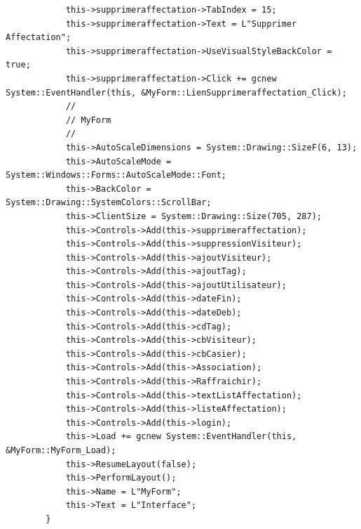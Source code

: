 \documentclass[main.tex]{subfiles}
\begin{document}
\begin{lstlisting}
			this->supprimeraffectation->TabIndex = 15;
			this->supprimeraffectation->Text = L"Supprimer Affectation";
			this->supprimeraffectation->UseVisualStyleBackColor = true;
			this->supprimeraffectation->Click += gcnew System::EventHandler(this, &MyForm::LienSupprimeraffectation_Click);
			// 
			// MyForm
			// 
			this->AutoScaleDimensions = System::Drawing::SizeF(6, 13);
			this->AutoScaleMode = System::Windows::Forms::AutoScaleMode::Font;
			this->BackColor = System::Drawing::SystemColors::ScrollBar;
			this->ClientSize = System::Drawing::Size(705, 287);
			this->Controls->Add(this->supprimeraffectation);
			this->Controls->Add(this->suppressionVisiteur);
			this->Controls->Add(this->ajoutVisiteur);
			this->Controls->Add(this->ajoutTag);
			this->Controls->Add(this->ajoutUtilisateur);
			this->Controls->Add(this->dateFin);
			this->Controls->Add(this->dateDeb);
			this->Controls->Add(this->cdTag);
			this->Controls->Add(this->cbVisiteur);
			this->Controls->Add(this->cbCasier);
			this->Controls->Add(this->Association);
			this->Controls->Add(this->Raffraichir);
			this->Controls->Add(this->textListAffectation);
			this->Controls->Add(this->listeAffectation);
			this->Controls->Add(this->login);
			this->Load += gcnew System::EventHandler(this, &MyForm::MyForm_Load);
			this->ResumeLayout(false);
			this->PerformLayout();
			this->Name = L"MyForm";
			this->Text = L"Interface";
		}


\end{lstlisting}
\end{document}
